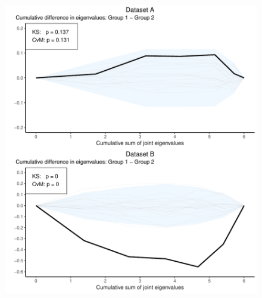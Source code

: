 \documentclass[]{interact}
\theoremstyle{plain}%
\theoremstyle{definition}
\theoremstyle{remark}
\begin{document}
\begin{figure}[H]
\center
\includegraphics[scale=0.8]{Figure2_PCADSC_v3.pdf}
\caption{}%
\label{plot.simCE} 
\end{figure}
\end{document}
